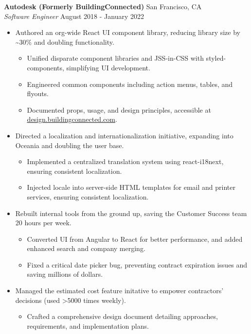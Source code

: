 \documentclass[a4paper]{article}
\begin{document}
\textbf{Autodesk (Formerly BuildingConnected)} \hfill San Francisco, CA\\
\textit{Software Engineer} \hfill August 2018 - January 2022\\
\vspace{-1mm}
\begin{itemize} \itemsep .5pt
    \item Authored an org-wide React UI component library, reducing library size by \textasciitilde{}30\% and doubling functionality.
    \begin{itemize} \itemsep .5pt
        \item Unified disparate component libraries and JSS-in-CSS with styled-components, simplifying UI development.
        \item Engineered common components including action menus, tables, and flyouts.
        \item Documented props, usage, and design principles, accessible at \href{https://design.buildingconnected.com/}{\underline{design.buildingconnected.com}}.
    \end{itemize}
    \item Directed a localization and internationalization initiative, expanding into Oceania and doubling the user base.
    \begin{itemize} \itemsep .5pt
        \item Implemented a centralized translation system using react-i18next, ensuring consistent localization.
        \item Injected locale into server-side HTML templates for email and printer services, ensuring consistent localization.  
    \end{itemize}
    \item Rebuilt internal tools from the ground up, saving the Customer Success team 20 hours per week.
    \begin{itemize} \itemsep .5pt
        \item Converted UI from Angular to React for better performance, and added enhanced search and company merging.
        \item Fixed a critical date picker bug, preventing contract expiration issues and saving millions of dollars.
    \end{itemize}
    \item Managed the estimated cost feature initative to empower contractors' decisions (used >5000 times weekly).
    \begin{itemize} \itemsep .5pt
        \item Crafted a comprehensive design document detailing approaches, requirements, and implementation plans.

\end{itemize}
\end{itemize}
\end{document}
